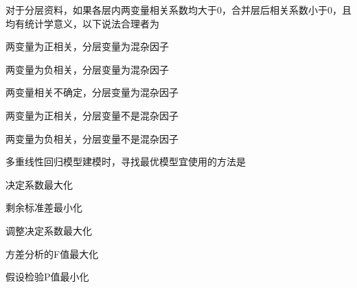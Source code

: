 \par\addvspace{6pt}\noindent\begin{minipage}{\linewidth}


对于分层资料，如果各层内两变量相关系数均大于0，合并层后相关系数小于0，且均有统计学意义，以下说法合理者为


\begin{choices}

\item 两变量为正相关，分层变量为混杂因子

\item 两变量为负相关，分层变量为混杂因子

\item 两变量相关不确定，分层变量为混杂因子

\item 两变量为正相关，分层变量不是混杂因子

\item 两变量为负相关，分层变量不是混杂因子

\end{choices}

\end{minipage}\par\vspace{4pt}

\par\addvspace{6pt}\noindent\begin{minipage}{\linewidth}


多重线性回归模型建模时，寻找最优模型宜使用的方法是


\begin{choices}

\item 决定系数最大化

\item 剩余标准差最小化

\item 调整决定系数最大化

\item 方差分析的F值最大化

\item 假设检验P值最小化

\end{choices}

\end{minipage}\par\vspace{4pt}

